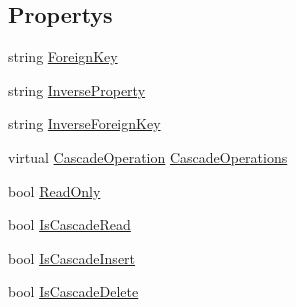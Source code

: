 \subsection*{Propertys}
\begin{DoxyCompactItemize}
\item 
string \mbox{\hyperlink{class_s_q_lite_net_extensions_1_1_attributes_1_1_relationship_attribute_af5fc4182158ea4da6e1b345cd0a09e79}{Foreign\+Key}}
\item 
string \mbox{\hyperlink{class_s_q_lite_net_extensions_1_1_attributes_1_1_relationship_attribute_a6302ea89b31299d8486ca7306c8b8ef0}{Inverse\+Property}}
\item 
string \mbox{\hyperlink{class_s_q_lite_net_extensions_1_1_attributes_1_1_relationship_attribute_a38084177a18ee0c68ffaf50dbfe92606}{Inverse\+Foreign\+Key}}
\item 
virtual \mbox{\hyperlink{namespace_s_q_lite_net_extensions_1_1_attributes_a84ac4ba359abf94192d7335a2303c619}{Cascade\+Operation}} \mbox{\hyperlink{class_s_q_lite_net_extensions_1_1_attributes_1_1_relationship_attribute_a9eed664a0e2e43c227a1255d62d7cf3e}{Cascade\+Operations}}
\item 
bool \mbox{\hyperlink{class_s_q_lite_net_extensions_1_1_attributes_1_1_relationship_attribute_a52012e486a916f58a6038f33ffd4af7f}{Read\+Only}}
\item 
bool \mbox{\hyperlink{class_s_q_lite_net_extensions_1_1_attributes_1_1_relationship_attribute_a223e2054d5355619a2839194de3c4bfb}{Is\+Cascade\+Read}}
\item 
bool \mbox{\hyperlink{class_s_q_lite_net_extensions_1_1_attributes_1_1_relationship_attribute_ae1525777d74d22b173db932d383483e2}{Is\+Cascade\+Insert}}
\item 
bool \mbox{\hyperlink{class_s_q_lite_net_extensions_1_1_attributes_1_1_relationship_attribute_a4dca0795fd0c06d47584ff868f66dd3a}{Is\+Cascade\+Delete}}
\end{DoxyCompactItemize}


